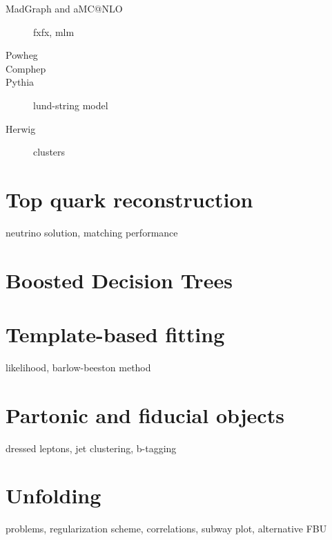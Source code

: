\begin{description}
\item[MadGraph and aMC{@}NLO] fxfx, mlm

\item[Powheg]

\item[Comphep]

\item[Pythia] lund-string model

\item[Herwig] clusters

\end{description}


\section{Top quark reconstruction}

neutrino solution, matching performance

\section{Boosted Decision Trees}
\cite{Hocker:2007ht}

\section{Template-based fitting}

likelihood, barlow-beeston method

\section{Partonic and fiducial objects}

dressed leptons, jet clustering, b-tagging

\section{Unfolding}

problems, regularization scheme, correlations, subway plot, alternative FBU
